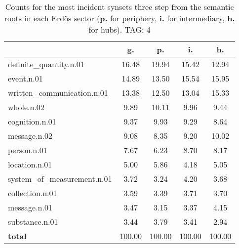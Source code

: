 \begin{table}[h!]
\begin{center}
\begin{tabular}{| l | c | c | c | c |}\hline
 & g. & p. & i. & h. \\\hline
definite\_quantity.n.01 & 16.48  & 19.94  & 15.42  & 12.94 \\\hline
event.n.01 & 14.89  & 13.50  & 15.54  & 15.95 \\\hline
written\_communication.n.01 & 13.38  & 12.50  & 13.04  & 15.33 \\\hline
whole.n.02 & 9.89  & 10.11  & 9.96  & 9.44 \\\hline
cognition.n.01 & 9.37  & 9.93  & 9.29  & 8.64 \\\hline
message.n.02 & 9.08  & 8.35  & 9.20  & 10.02 \\\hline
person.n.01 & 7.67  & 6.23  & 8.70  & 8.17 \\\hline
location.n.01 & 5.00  & 5.86  & 4.18  & 5.05 \\\hline
system\_of\_measurement.n.01 & 3.72  & 3.24  & 4.20  & 3.68 \\\hline
collection.n.01 & 3.59  & 3.39  & 3.71  & 3.70 \\\hline
message.n.01 & 3.47  & 3.15  & 3.37  & 4.15 \\\hline
substance.n.01 & 3.44  & 3.79  & 3.41  & 2.94 \\\hline
{{\bf total}} & 100.00  & 100.00  & 100.00  & 100.00 \\\hline
\end{tabular}
\caption{Counts for the most incident synsets three step from the semantic roots in each Erd\"os sector ({\bf p.} for periphery, {\bf i.} for intermediary, {\bf h.} for hubs). TAG: 4}
\end{center}
\end{table}